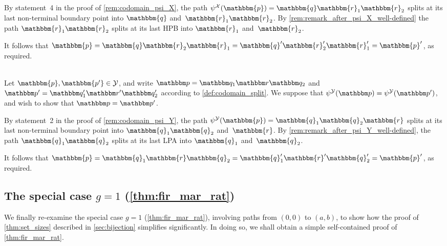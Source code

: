 \documentclass[11pt]{article}
\theoremstyle{definition} %
\numberwithin{equation}{section}
\begin{document}
\begin{description}
        By statement~4 in the proof of \cref{rem:codomain_psi_X},
        the path $\psi^{\mathcal X}(\mathbbm{p}) = \mathbbm{q} \mathbbm{r}_1 \mathbbm{r}_2$ splits at its last non-terminal boundary point into $\mathbbm{q}$ and~$\mathbbm{r}_1 \mathbbm{r}_2$.
        By \cref{rem:remark_after_psi_X_well-defined}
        the path $\mathbbm{r}_1 \mathbbm{r}_2$ splits at its last HPB into $\mathbbm{r}_1$ and~$\mathbbm{r}_2$.
        
        It follows that 
        $\mathbbm{p} = \mathbbm{q} \mathbbm{r}_2 \mathbbm{r}_1 = \mathbbm{q}' \mathbbm{r}_2' \mathbbm{r}_1' = \mathbbm{p}'$, as required.

    \item[The map $\psi^\mathcal Y$ is injective:]\hfill \\[6pt]
        Let $\mathbbm{p}, \mathbbm {p'} \in \mathcal Y$, and write $\mathbbm p = \mathbbm q_1 \mathbbm r \mathbbm q_2$ and $\mathbbm p' = \mathbbm q_1' \mathbbm r' \mathbbm q_2'$ according to \cref{def:codomain_split}. 
        We suppose that $\psi^\mathcal Y(\mathbbm p) = \psi^\mathcal Y(\mathbbm p')$, and wish to show that $\mathbbm p=\mathbbm p'$.

        By statement~2 in the proof of \cref{rem:codomain_psi_Y}, the path $\psi^{\mathcal Y}(\mathbbm{p}) = \mathbbm{q}_1 \mathbbm{q}_2 \mathbbm{r}$ splits at its last non-terminal boundary point into $\mathbbm{q}_1 \mathbbm{q}_2$ and~$\mathbbm{r}$.
        By \cref{rem:remark_after_psi_Y_well-defined},
        the path $\mathbbm{q}_1 \mathbbm{q}_2$ splits at its last LPA into $\mathbbm{q}_1$ and~$\mathbbm{q}_2$.
        
        It follows that 
        $\mathbbm{p} = \mathbbm{q}_1 \mathbbm{r} \mathbbm{q}_2 = \mathbbm{q}_1' \mathbbm{r}' \mathbbm{q}_2' = \mathbbm{p}'$, as required.

\end{description}


\subsection{The special case \texorpdfstring{$g=1$}{geq1} \texorpdfstring{(\cref{thm:fir_mar_rat})}{}}
\label{sec:geqaul1}

We finally re-examine the special case $g=1$ (\cref{thm:fir_mar_rat}), involving paths from $(0,0)$ to $(a,b)$, to show how the proof of \cref{thm:set_sizes} described in \cref{sec:bijection} simplifies significantly.   In doing so, we shall obtain a simple self-contained proof of \cref{thm:fir_mar_rat}.
\end{document}

